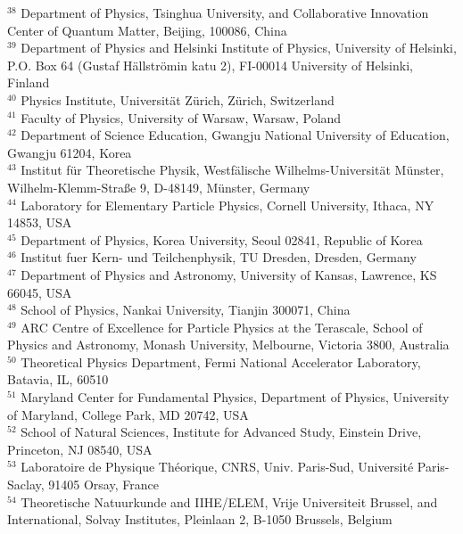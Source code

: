 {$^{38}$ Department of Physics, Tsinghua University, and Collaborative Innovation Center of Quantum Matter, Beijing, 100086, China \\ 
$^{39}$ Department of Physics and Helsinki Institute of Physics, University of Helsinki, P.O. Box 64 (Gustaf H\"allstr\"omin katu 2), FI-00014 University of Helsinki, Finland \\ 
$^{40}$ Physics Institute, Universit\"at Z\"urich, Z\"urich, Switzerland \\ 
$^{41}$ Faculty of Physics, University of Warsaw, Warsaw, Poland \\ 
$^{42}$ Department of Science Education, Gwangju National University of Education, Gwangju 61204, Korea \\ 
$^{43}$ Institut f\"ur Theoretische Physik, Westf\"alische Wilhelms-Universit\"at M\"unster, Wilhelm-Klemm-Stra\ss e 9, D-48149, M\"unster, Germany \\ 
$^{44}$ Laboratory for Elementary Particle Physics, Cornell University, Ithaca, NY 14853, USA \\ 
$^{45}$ Department of Physics, Korea University, Seoul 02841, Republic of Korea \\ 
$^{46}$ Institut fuer Kern- und Teilchenphysik, TU Dresden, Dresden, Germany \\ 
$^{47}$ Department of Physics and Astronomy, University of Kansas, Lawrence, KS 66045, USA \\ 
$^{48}$ School of Physics, Nankai University, Tianjin 300071, China \\ 
$^{49}$ ARC Centre of Excellence for Particle Physics at the Terascale, School of Physics and Astronomy, Monash University, Melbourne, Victoria 3800, Australia \\ 
$^{50}$ Theoretical Physics Department, Fermi National Accelerator Laboratory, Batavia, IL, 60510 \\ 
$^{51}$ Maryland Center for Fundamental Physics, Department of Physics, University of Maryland, College Park, MD 20742, USA \\ 
$^{52}$ School of Natural Sciences, Institute for Advanced Study, Einstein Drive, Princeton, NJ 08540, USA \\ 
$^{53}$ Laboratoire de Physique Th\'eorique, CNRS, Univ. Paris-Sud, Universit\'e Paris-Saclay, 91405 Orsay, France \\ 
$^{54}$ Theoretische Natuurkunde and IIHE/ELEM, Vrije Universiteit Brussel, and International, Solvay Institutes, Pleinlaan 2, B-1050 Brussels, Belgium \\ 
}
